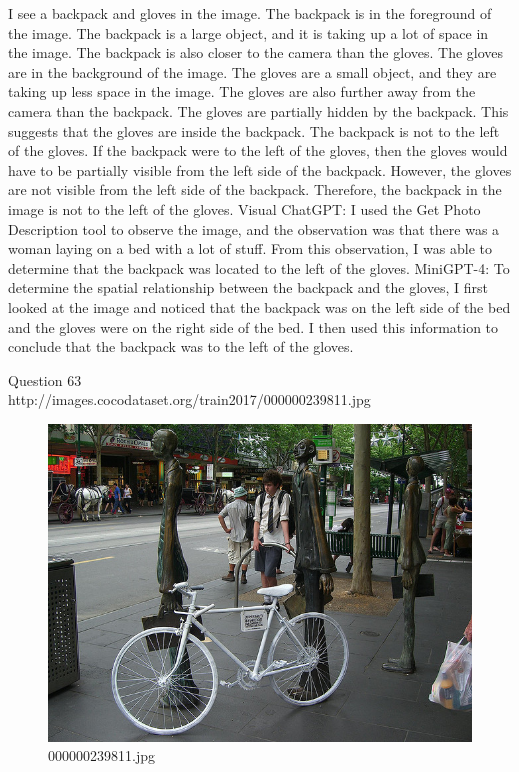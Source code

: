 \begin{enumerate}
    I see a backpack and gloves in the image.
    The backpack is in the foreground of the image. The backpack is a large object, and it is taking up a lot of space in the image. The backpack is also closer to the camera than the gloves.
    The gloves are in the background of the image. The gloves are a small object, and they are taking up less space in the image. The gloves are also further away from the camera than the backpack.
    The gloves are partially hidden by the backpack. This suggests that the gloves are inside the backpack.
    The backpack is not to the left of the gloves. If the backpack were to the left of the gloves, then the gloves would have to be partially visible from the left side of the backpack. However, the gloves are not visible from the left side of the backpack.
    Therefore, the backpack in the image is not to the left of the gloves.
    \subitem Visual ChatGPT: I used the Get Photo Description tool to observe the image, and the observation was that there was a woman laying on a bed with a lot of stuff. From this observation, I was able to determine that the backpack was located to the left of the gloves.
    \subitem MiniGPT-4: To determine the spatial relationship between the backpack and the gloves, I first looked at the image and noticed that the backpack was on the left side of the bed and the gloves were on the right side of the bed. I then used this information to conclude that the backpack was to the left of the gloves.
\end{enumerate}
Question 63\\
http://images.cocodataset.org/train2017/000000239811.jpg
\begin{figure}[h]
    \centering
    \includegraphics[width=0.8\linewidth]{../image set/hard/000000239811.jpg}
    \caption{000000239811.jpg}
\end{figure}

